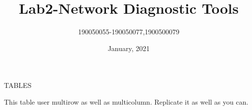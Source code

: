 \documentclass{article}
\theoremstyle{remark}
\begin{document}
\title{Lab2-Network Diagnostic Tools}
\author{190050055-190050077,1900500079}
\date{January, 2021}
\maketitle
\thispagestyle{empty}
\clearpage
{}



\large{TABLES}

\begin{table}[H]
    \centering
    \caption{Some common time complexities}
    \label{Table 1:}
\end{table}

                  
  
  
  
This table user multirow as well as multicolumn. Replicate it as well as you can.
\end{document}
